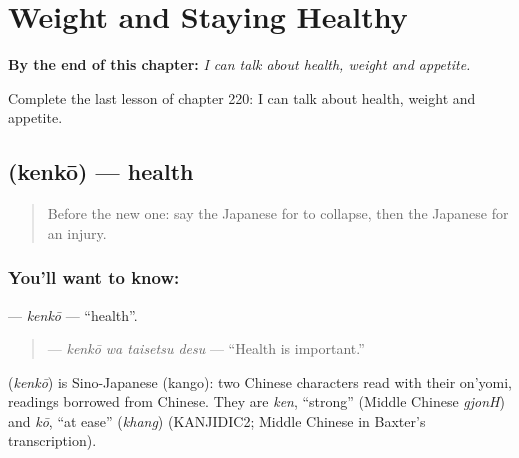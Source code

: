 
\chapter{Weight and Staying Healthy}
\label{ch:ja-weight-and-staying-healthy}

\begin{chapteropening}
\textbf{By the end of this chapter:} \emph{I can talk about health, weight and appetite.}

Complete the last lesson of chapter 220: I can talk about health, weight and appetite.
\end{chapteropening}

\section[\texorpdfstring{\ja{けんこう} (kenkō)}{けんこう (kenkō)}]{ (kenkō) — health}

\label{lesson:JA-C220-kenkou}



\begin{quote}
Before the new one: say the Japanese for to collapse, then the Japanese for an injury.
\end{quote}

\subsection*{You'll want to know: }
\textbf{} — \emph{kenkō} — \textquotedblleft{}health\textquotedblright{}.

\begin{quote}
\textbf{ } — \emph{kenkō wa taisetsu desu} — \textquotedblleft{}Health is important.\textquotedblright{}
\end{quote}

\begin{cousinweb}
\textbf{} (\emph{kenkō}) is Sino-Japanese (kango): two Chinese characters read with their on'yomi, readings borrowed from Chinese. They are \emph{ken}, \textquotedblleft{}strong\textquotedblright{} (Middle Chinese \emph{gjonH}) and \emph{kō}, \textquotedblleft{}at ease\textquotedblright{} (\emph{khang}) (KANJIDIC2; Middle Chinese in Baxter's transcription).
\end{cousinweb}

